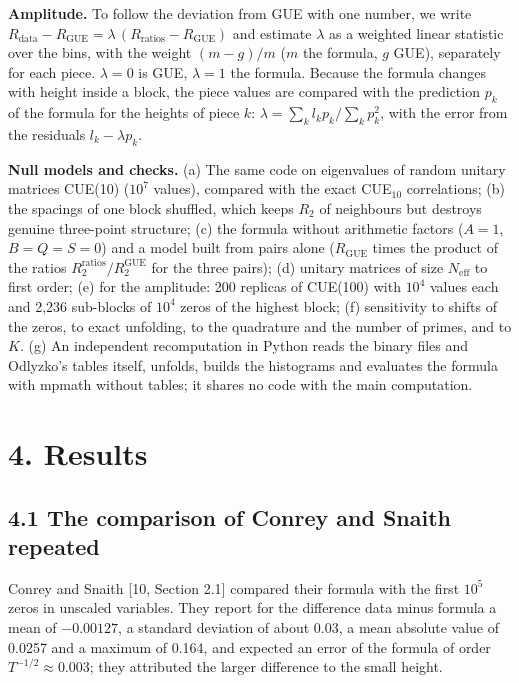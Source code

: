 \documentclass[
  10pt,
]{article}
\begin{document}
\textbf{Amplitude.} To follow the deviation from GUE with one number, we
write
\(R_{\mathrm{data}} - R_{\mathrm{GUE}} = \lambda\,(R_{\mathrm{ratios}} - R_{\mathrm{GUE}})\)
and estimate \(\lambda\) as a weighted linear statistic over the bins,
with the weight \((m - g)/m\) (\(m\) the formula, \(g\) GUE), separately
for each piece. \(\lambda = 0\) is GUE, \(\lambda = 1\) the formula.
Because the formula changes with height inside a block, the piece values
are compared with the prediction \(p_k\) of the formula for the heights
of piece \(k\): \(\lambda = \sum_k l_k p_k / \sum_k p_k^2\), with the
error from the residuals \(l_k - \lambda p_k\).

\textbf{Null models and checks.} (a) The same code on eigenvalues of
random unitary matrices CUE(10) (\(10^7\) values), compared with the
exact CUE\(_{10}\) correlations; (b) the spacings of one block shuffled,
which keeps \(R_2\) of neighbours but destroys genuine three-point
structure; (c) the formula without arithmetic factors (\(A = 1\),
\(B = Q = S = 0\)) and a model built from pairs alone
(\(R_{\mathrm{GUE}}\) times the product of the ratios
\(R_2^{\mathrm{ratios}}/R_2^{\mathrm{GUE}}\) for the three pairs); (d)
unitary matrices of size \(N_{\mathrm{eff}}\) to first order; (e) for
the amplitude: 200 replicas of CUE(100) with \(10^4\) values each and
2,236 sub-blocks of \(10^4\) zeros of the highest block; (f) sensitivity
to shifts of the zeros, to exact unfolding, to the quadrature and the
number of primes, and to \(K\). (g) An independent recomputation in
Python reads the binary files and Odlyzko's tables itself, unfolds,
builds the histograms and evaluates the formula with mpmath without
tables; it shares no code with the main computation.

\hypertarget{results}{%
\section{4. Results}\label{results}}

\hypertarget{the-comparison-of-conrey-and-snaith-repeated}{%
\subsection{4.1 The comparison of Conrey and Snaith
repeated}\label{the-comparison-of-conrey-and-snaith-repeated}}

Conrey and Snaith {[}10, Section 2.1{]} compared their formula with the
first \(10^5\) zeros in unscaled variables. They report for the
difference data minus formula a mean of \(-0.00127\), a standard
deviation of about 0.03, a mean absolute value of 0.0257 and a maximum
of 0.164, and expected an error of the formula of order
\(T^{-1/2} \approx 0.003\); they attributed the larger difference to the
small height.
\end{document}
